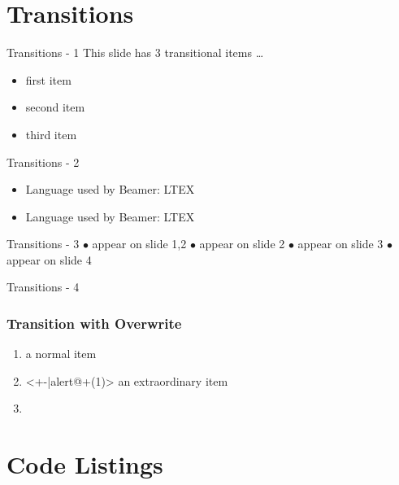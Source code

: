 \documentclass[pdf]{beamer}
\begin{document}
\section{Transitions}

\begin{frame}{Transitions - 1}
  This slide has 3 transitional items \ldots
  \begin{itemize}
    \item<+-|alert@+> first item
    \item<+-|alert@+> second item
    \item<+-|alert@+> third item
  \end{itemize}
\end{frame}

\begin{frame}{Transitions - 2}
  \begin{itemize}
    \item Language used by Beamer: LTEX
    \item Language used by Beamer: LTEX
  \end{itemize}
\end{frame}

\begin{frame}[t]{Transitions - 3}
   {{\small\color{blue}$\bullet$} appear on slide 1,2 \newline}
   {{\small\color{blue}$\bullet$} appear on slide 2 \newline}
   {{\small\color{blue}$\bullet$} appear on slide 3 \newline}
   {{\small\color{blue}$\bullet$} appear on slide 4 \newline}
\end{frame}

\begin{frame}{Transitions - 4}
  \frametitle{Transition with Overwrite}
  \begin{enumerate}
    \item<+-> {a normal item}
    \item<+-|alert@+(1)> {an extraordinary item}
    \item[]
  \end{enumerate}
\end{frame}

\section{Code Listings}
\end{document}
